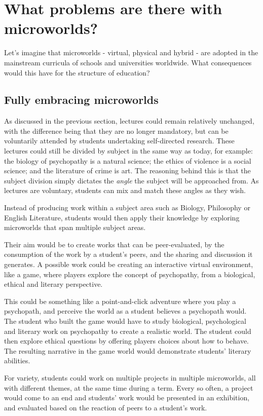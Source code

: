\section{What problems are there with microworlds?}

Let's imagine that microworlds - virtual, physical and hybrid - are
adopted in the mainstream curricula of schools and universities
worldwide. What consequences would this have for the structure of
education?

\subsection{Fully embracing microworlds}

As discussed in the previous section, lectures could remain relatively
unchanged, with the difference being that they are no longer mandatory,
but can be voluntarily attended by students undertaking self-directed
research. These lectures could still be divided by subject in the same
way as today, for example: the biology of psychopathy is a natural
science; the ethics of violence is a social science; and the literature
of crime is art. The reasoning behind this is that the subject division
simply dictates the \emph{angle} the subject will be approached from. As
lectures are voluntary, students can mix and match these angles as they
wish.

Instead of producing work within a subject area such as Biology,
Philosophy or English Literature, students would then apply their
knowledge by exploring microworlds that span multiple subject areas.

Their aim would be to create works that can be peer-evaluated, by the
consumption of the work by a student's peers, and the sharing and
discussion it generates. A possible work could be creating an
interactive virtual environment, like a game, where players explore the
concept of psychopathy, from a biological, ethical and literary
perspective.

This could be something like a point-and-click adventure where you play
a psychopath, and perceive the world as a student believes a psychopath
would. The student who built the game would have to study biological,
psychological and literary work on psychopathy to create a realistic
world. The student could then explore ethical questions by offering
players choices about how to behave. The resulting narrative in the game
world would demonstrate students' literary abilities.

For variety, students could work on multiple projects in multiple
microworlds, all with different themes, at the same time during a term.
Every so often, a project would come to an end and students' work would
be presented in an exhibition, and evaluated based on the reaction of
peers to a student's work.

